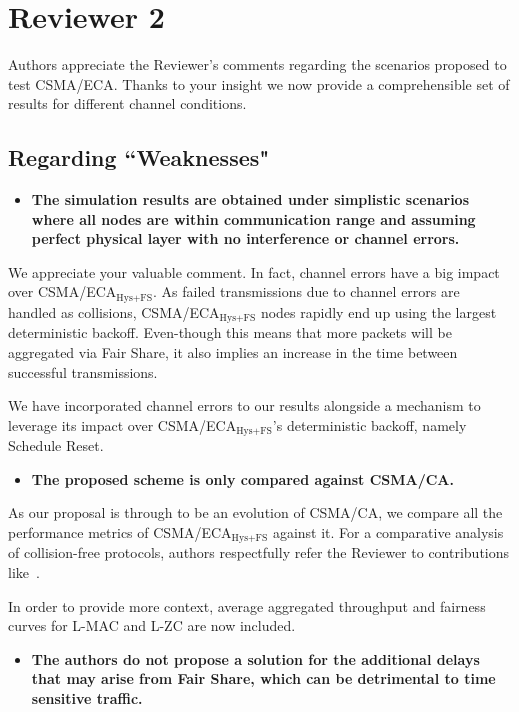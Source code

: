 \documentclass[]{article}
\begin{document}
		
		
\section{Reviewer 2}
Authors appreciate the Reviewer's comments regarding the scenarios proposed to test CSMA/ECA. Thanks to your insight we now provide a comprehensible set of results for different channel conditions.

	\subsection{Regarding ``Weaknesses"}
	\begin{itemize}
		\item {\bfseries The simulation results are obtained under simplistic scenarios where all nodes are within communication range and assuming perfect physical layer with no interference or channel errors.}
	\end{itemize}
	
	We appreciate your valuable comment. In fact, channel errors have a big impact over CSMA/ECA$_{\text{Hys+FS}}$. As failed transmissions due to channel errors are handled as collisions, CSMA/ECA$_{\text{Hys+FS}}$ nodes rapidly end up using the largest deterministic backoff. Even-though this means that more packets will be aggregated via Fair Share, it also implies an increase in the time between successful transmissions. 
	
	We have incorporated channel errors to our results alongside a mechanism to leverage its impact over CSMA/ECA$_{\text{Hys+FS}}$'s deterministic backoff, namely Schedule Reset.
	
	\begin{itemize}
		\item {\bfseries The proposed scheme is only compared against CSMA/CA.}
	\end{itemize}

	As our proposal is through to be an evolution of CSMA/CA, we compare all the performance metrics of CSMA/ECA$_{\text{Hys+FS}}$ against it. For a comparative analysis of collision-free protocols, authors respectfully refer the Reviewer to contributions like~\cite{L_MAC}.
	
	 In order to provide more context, average aggregated throughput and fairness curves for L-MAC and L-ZC are now included.
	
	\begin{itemize}
		\item {\bfseries The authors do not propose a solution for the additional delays that may arise from Fair Share, which can be detrimental to time sensitive traffic.}
	\end{itemize}
	
\end{document}
